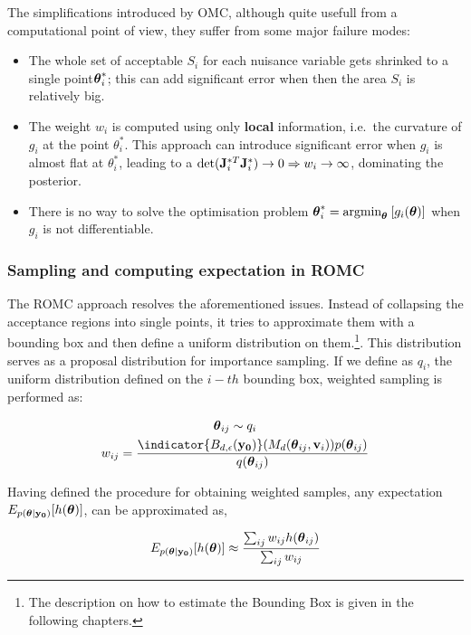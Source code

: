The simplifications introduced by OMC, although quite usefull from a
computational point of view, they suffer from some major failure modes:

\begin{itemize}
\item The whole set of acceptable $S_i$ for each nuisance variable
  gets shrinked to a single point$\boldsymbol{\theta}_i^*$; this can add
  significant error when then the area $S_i$ is relatively big.
\item The weight $w_i$ is computed using only \textbf{local}
  information, i.e.\ the curvature of $g_i$ at the point
  $\theta_i^*$. This approach can introduce significant error when
  $g_i$ is almost flat at $\theta_i^*$, leading to a
  $\text{det}(\mathbf{J}_i^{*T}\mathbf{J}_i^*) \rightarrow 0 \Rightarrow w_i
  \rightarrow \infty$, dominating the posterior.
\item There is no way to solve the optimisation problem
  $\boldsymbol{\theta}_i^* = \text{argmin}_{\boldsymbol{\theta}} \: [g_i(\boldsymbol{\theta})]$ when $g_i$
  is not differentiable.
\end{itemize}


\subsubsection{Sampling and computing expectation in ROMC}

The ROMC approach resolves the aforementioned issues. Instead of
collapsing the acceptance regions into single points, it tries to
approximate them with a bounding box and then define a uniform
distribution on them.\footnote{The description on how to estimate the
  Bounding Box is given in the following chapters.}. This distribution
serves as a proposal distribution for importance sampling. If we
define as $q_i$, the uniform distribution defined on the $i-th$
bounding box, weighted sampling is performed as:

\begin{gather}
  \label{eq:sampling}
  \thetab_{ij} \sim q_i \\
  w_{ij} = \frac{\indicator{\region(\data)}(M_d(\thetab_{ij}, \vb_i)) p(\thetab_{ij})}{q(\thetab_{ij})}
\end{gather}

\noindent
Having defined the procedure for obtaining weighted samples, any expectation $E_{p(\boldsymbol{\theta}|\mathbf{y_0})}[h(\boldsymbol{\theta})]$, can be approximated as,

\begin{equation} \label{eq:expectation}
  E_{p(\boldsymbol{\theta}|\mathbf{y_0})}[h(\boldsymbol{\theta})] \approx \frac{\sum_{ij} w_{ij} h(\boldsymbol{\theta}_{ij})}{\sum_{ij} w_{ij}}
\end{equation}


